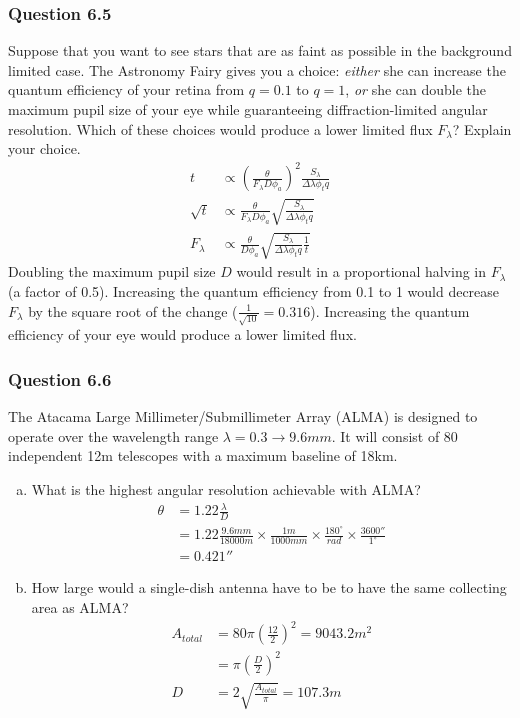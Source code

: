 \documentclass{math}
\begin{document}
\subsubsection*{Question 6.5}
Suppose that you want to see stars that are as faint as possible in the
background limited case. The Astronomy Fairy gives you a choice: \textit{either}
she can increase the quantum efficiency of your retina from \( q = 0.1 \) to
\( q = 1 \), \textit{or} she can double the maximum pupil size of your eye while
guaranteeing diffraction-limited angular resolution. Which of these choices
would produce a lower limited flux \( F_{\lambda} \)? Explain your choice.
\begin{align*}
  t &\propto \left(\frac{\theta}{F_{\lambda}D\phi_a}\right)^2
    \frac{S_{\lambda}}{\Delta\lambda\phi_tq} \\
  \sqrt{t} &\propto \frac{\theta}{F_{\lambda}D\phi_a}
    \sqrt{\frac{S_{\lambda}}{\Delta\lambda\phi_tq}} \\
  F_{\lambda} &\propto \frac{\theta}{D\phi_a}\sqrt{
    \frac{S_{\lambda}}{\Delta\lambda\phi_tq}
    \frac{1}{t}}
\end{align*}
Doubling the maximum pupil size \( D \) would result in a proportional halving
in \( F_{\lambda} \) (a factor of 0.5). Increasing the quantum efficiency from
0.1 to 1 would decrease \( F_{\lambda} \) by the square root of the change
(\( \frac{1}{\sqrt{10}} = 0.316 \)). Increasing the quantum efficiency of your
eye would produce a lower limited flux.

\subsubsection*{Question 6.6}
The Atacama Large Millimeter/Submillimeter Array (ALMA) is designed to operate
over the wavelength range \( \lambda = 0.3\to9.6mm \). It will consist of 80
independent 12m telescopes with a maximum baseline of 18km.
\begin{enumerate}[(a)]
  \item What is the highest angular resolution achievable with ALMA?
  \begin{align*}
    \theta &= 1.22\frac{\lambda}{D} \\
    &= 1.22\frac{9.6mm}{18000m}\times\frac{1m}{1000mm}\times
      \frac{180^{\circ}}{rad}\times\frac{3600''}{1^{\circ}} \\
    &= 0.421''
  \end{align*}
  \item How large would a single-dish antenna have to be to have the same
    collecting area as ALMA?
  \begin{align*}
    A_{total} &= 80\pi(\frac{12}{2})^2 = 9043.2m^2 \\
    &= \pi(\frac{D}{2})^2 \\
    D &= 2\sqrt{\frac{A_{total}}{\pi}} = 107.3m
  \end{align*}
\end{enumerate}
\end{document}
